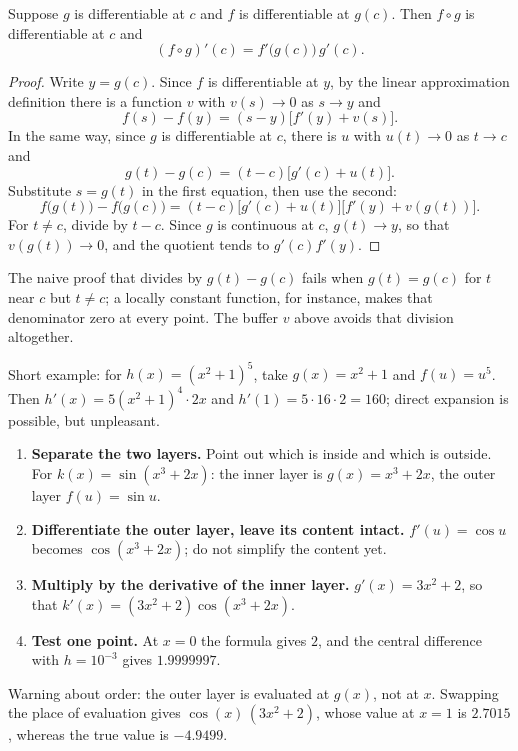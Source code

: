 
\begin{teorema}
Suppose $g$ is differentiable at $c$ and $f$ is differentiable at $g(c)$. Then $f\circ g$
is differentiable at $c$ and
\[
  (f\circ g)'(c)=f'\bigl(g(c)\bigr)\,g'(c).
\]
\end{teorema}

\begin{proof}
Write $y=g(c)$. Since $f$ is differentiable at $y$, by the linear approximation definition
there is a function $v$ with $v(s)\to0$ as $s\to y$ and
\[
  f(s)-f(y)=(s-y)\bigl[f'(y)+v(s)\bigr].
\]
In the same way, since $g$ is differentiable at $c$, there is $u$ with $u(t)\to0$ as
$t\to c$ and
\[
  g(t)-g(c)=(t-c)\bigl[g'(c)+u(t)\bigr].
\]
Substitute $s=g(t)$ in the first equation, then use the second:
\[
  f\bigl(g(t)\bigr)-f\bigl(g(c)\bigr)
  =(t-c)\bigl[g'(c)+u(t)\bigr]\bigl[f'(y)+v(g(t))\bigr].
\]
For $t\neq c$, divide by $t-c$. Since $g$ is continuous at $c$, $g(t)\to y$, so that
$v(g(t))\to0$, and the quotient tends to $g'(c)f'(y)$.
\end{proof}

The naive proof that divides by $g(t)-g(c)$ fails when $g(t)=g(c)$ for $t$ near $c$ but
$t\neq c$; a locally constant function, for instance, makes that denominator zero at every
point. The buffer $v$ above avoids that division altogether.

Short example: for $h(x)=(x^{2}+1)^{5}$, take $g(x)=x^{2}+1$ and $f(u)=u^{5}$. Then
$h'(x)=5(x^{2}+1)^{4}\cdot2x$ and $h'(1)=5\cdot16\cdot2=160$; direct expansion is possible,
but unpleasant.

\begin{resep}
\begin{enumerate}
  \item \textbf{Separate the two layers.} Point out which is inside and which is outside. For
        $k(x)=\sin(x^{3}+2x)$: the inner layer is $g(x)=x^{3}+2x$, the outer layer
        $f(u)=\sin u$.
  \item \textbf{Differentiate the outer layer, leave its content intact.} $f'(u)=\cos u$
        becomes $\cos(x^{3}+2x)$; do not simplify the content yet.
  \item \textbf{Multiply by the derivative of the inner layer.} $g'(x)=3x^{2}+2$, so that
        $k'(x)=(3x^{2}+2)\cos(x^{3}+2x)$.
  \item \textbf{Test one point.} At $x=0$ the formula gives $2$, and the central difference
        with $h=10^{-3}$ gives $1.9999997$.
\end{enumerate}
Warning about order: the outer layer is evaluated at $g(x)$, not at $x$. Swapping the place of
evaluation gives $\cos(x)\,(3x^{2}+2)$, whose value at $x=1$ is $2.7015$, whereas the true
value is $-4.9499$.
\end{resep}

